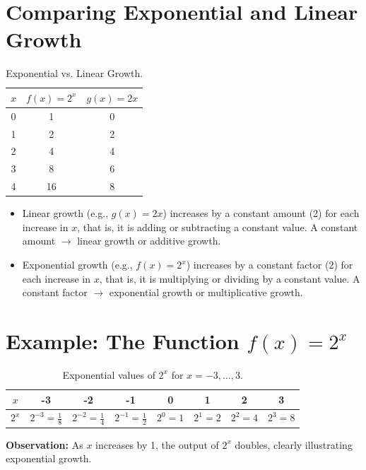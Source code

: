 \section{Comparing Exponential and Linear Growth}
\begin{table}[ht]
  \centering
  \begin{tabular}{c|c|c}
    \(x\) & \(f(x)=2^x\) & \(g(x)=2x\) \\ \hline
    0 & 1 & 0 \\
    1 & 2 & 2 \\
    2 & 4 & 4 \\
    3 & 8 & 6 \\
    4 & 16 & 8 \\
  \end{tabular}
  \caption{Exponential vs. Linear Growth.}
\end{table}
\begin{itemize}
  \item Linear growth (e.g., \(g(x)=2x\)) increases by a constant amount (2) for each increase in \(x\), that is, it is adding or subtracting a constant value. A constant amount \( \rightarrow \) linear growth or additive growth.
  \item Exponential growth (e.g., \(f(x)=2^x\)) increases by a constant factor (2) for each increase in \(x\), that is, it is multiplying or dividing by a constant value. A constant factor \( \rightarrow \) exponential growth or multiplicative growth.
\end{itemize}

\section{Example: The Function \(f(x)=2^x\)}
\begin{table}[ht]
  \centering
  \begin{tabular}{|c|c|c|c|c|c|c|c|}
    \hline
    \(x\)      & -3 & -2 & -1 & 0 & 1 & 2 & 3 \\ \hline
    \(2^x\) & \(2^{-3}=\frac{1}{8}\) & \(2^{-2}=\frac{1}{4}\) & \(2^{-1}=\frac{1}{2}\) & \(2^0=1\) & \(2^1=2\) & \(2^2=4\) & \(2^3=8\) \\ \hline
  \end{tabular}
  \caption{Exponential values of \(2^x\) for \(x=-3,\dots,3\).}
\end{table}
\textbf{Observation:} As \(x\) increases by 1, the output of \(2^x\) doubles, clearly illustrating exponential growth.

